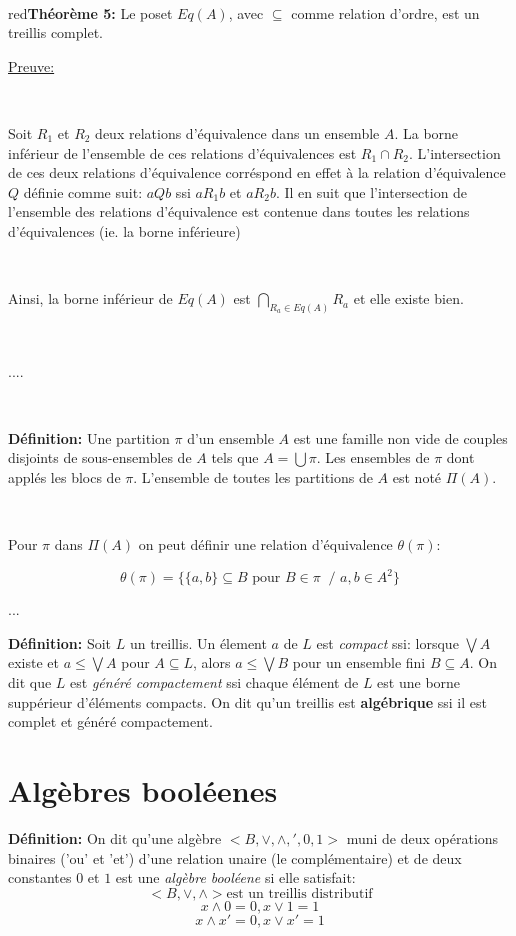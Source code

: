 \documentclass[a4paper, 11pt]{article}
\begin{document}
\

\begin{mybox}{red}{\textbf{Théorème 5:}}
	Le poset $Eq(A)$, avec $\subseteq$ comme relation d'ordre, est un treillis complet.
\end{mybox}

\noindent
\underline{Preuve:} 

\

Soit $R_1$ et $R_2$ deux relations d'équivalence dans un ensemble $A$. La borne inférieur de l'ensemble de ces relations d'équivalences est $R_1 \cap R_2$. L'intersection de ces deux relations d'équivalence corréspond en effet à la relation d'équivalence $Q$ définie comme suit: $aQb$ ssi $aR_1b$ et $aR_2b$. Il en suit que l'intersection de l'ensemble des relations d'équivalence est contenue dans toutes les relations d'équivalences (ie. la borne inférieure)

\

Ainsi, la borne inférieur de $Eq(A)$ est $\bigcap_{R_a \in Eq(A)} R_a$ et elle existe bien.

\

....

\

\begin{tcolorbox} 
	\textbf{Définition:} Une partition $\pi$ d'un ensemble $A$ est une famille non vide de couples disjoints de sous-ensembles de $A$ tels que $A = \bigcup \pi$. Les ensembles de $\pi$ dont applés les blocs de $\pi$. L'ensemble de toutes les partitions de $A$ est noté $\Pi(A)$.

\

\end{tcolorbox}

Pour $\pi$ dans $\Pi(A)$ on peut définir une relation d'équivalence $\theta(\pi)$:

$$\theta(\pi) =\{\{a,b\} \subseteq B \text{ pour } B \in \pi\ \text{ / } a,b \in A^2\}$$
 
...

\begin{tcolorbox} 
	\textbf{Définition:} Soit $L$ un treillis. Un élement $a$ de $L$ est \textit{compact} ssi: lorsque $\bigvee A$ existe et $a \leq \bigvee A$ pour $A \subseteq L$, alors $a \leq \bigvee B$ pour un ensemble fini $B \subseteq A$. On dit que $L$ est \textit{généré compactement} ssi chaque élément de $L$ est une borne suppérieur d'éléments compacts. On dit qu'un treillis est \textbf{algébrique} ssi il est complet et généré compactement.
\end{tcolorbox}

\section{Algèbres booléenes}

\begin{tcolorbox} 
	\textbf{Définition:} On dit qu'une algèbre $<B, \lor, \land, ', 0, 1>$ muni de deux opérations binaires ('ou' et 'et') d'une relation unaire (le complémentaire) et de deux constantes $0$ et $1$ est une \textit{algèbre booléene} si elle satisfait: 
	$$<B, \lor, \land> \text{est un treillis distributif}$$
	$$x \land 0 = 0, x \lor 1 = 1$$
	$$x \land x' = 0, x \lor x' = 1$$
\end{tcolorbox}
\end{document}
